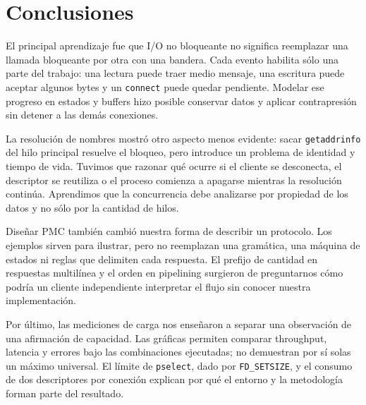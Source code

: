 \section{Conclusiones}

El principal aprendizaje fue que I/O no bloqueante no significa reemplazar una
llamada bloqueante por otra con una bandera. Cada evento habilita sólo una parte
del trabajo: una lectura puede traer medio mensaje, una escritura puede aceptar
algunos bytes y un \texttt{connect} puede quedar pendiente. Modelar ese progreso
en estados y buffers hizo posible conservar datos y aplicar contrapresión sin
detener a las demás conexiones.

La resolución de nombres mostró otro aspecto menos evidente: sacar
\texttt{getaddrinfo} del hilo principal resuelve el bloqueo, pero introduce un
problema de identidad y tiempo de vida. Tuvimos que razonar qué ocurre si el
cliente se desconecta, el descriptor se reutiliza o el proceso comienza a
apagarse mientras la resolución continúa. Aprendimos que la concurrencia debe
analizarse por propiedad de los datos y no sólo por la cantidad de hilos.

Diseñar PMC también cambió nuestra forma de describir un protocolo. Los ejemplos
sirven para ilustrar, pero no reemplazan una gramática, una máquina de estados ni
reglas que delimiten cada respuesta. El prefijo de cantidad en respuestas
multilínea y el orden en pipelining surgieron de preguntarnos cómo podría un
cliente independiente interpretar el flujo sin conocer nuestra implementación.

Por último, las mediciones de carga nos enseñaron a separar una observación de
una afirmación de capacidad. Las gráficas permiten comparar throughput, latencia
y errores bajo las combinaciones ejecutadas; no demuestran por sí solas un máximo
universal. El límite de \texttt{pselect}, dado por \texttt{FD\_SETSIZE}, y el consumo de dos
descriptores por conexión explican por qué el entorno y la metodología forman
parte del resultado.

